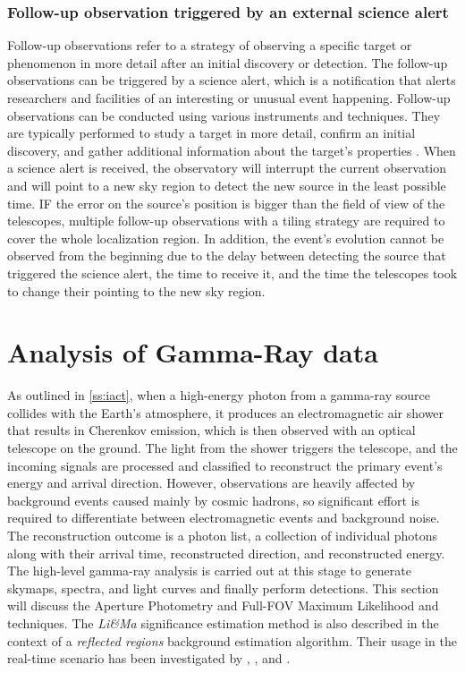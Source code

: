 \subsubsection{Follow-up observation triggered by an external science alert}
\label{s:follow-up-observation}
Follow-up observations refer to a strategy of observing a specific target or phenomenon in more detail after an initial discovery or detection. The follow-up observations can be triggered by a science alert, which is a notification that alerts researchers and facilities of an interesting or unusual event happening. Follow-up observations can be conducted using various instruments and techniques. They are typically performed to study a target in more detail, confirm an initial discovery, and gather additional information about the target's properties \cite{ScienceWithCherenkovTelescopeArray2018}. When a science alert is received, the observatory will interrupt the current observation and will point to a new sky region to detect the new source in the least possible time. IF the error on the source's position is bigger than the field of view of the telescopes,  multiple follow-up observations with a tiling strategy \cite{bulgarelli2015on} are required to cover the whole localization region. In addition, the event's evolution cannot be observed from the beginning due to the delay between detecting the source that triggered the science alert, the time to receive it, and the time the telescopes took to change their pointing to the new sky region. 



\section{Analysis of Gamma-Ray data}
\label{s:gamma-ray-data-analysis}
As outlined in \autoref{ss:iact}, when a high-energy photon from a gamma-ray source collides with the Earth's atmosphere, it produces an electromagnetic air shower that results in Cherenkov emission, which is then observed with an optical telescope on the ground. The light from the shower triggers the telescope, and the incoming signals are processed and classified to reconstruct the primary event's energy and arrival direction. However, observations are heavily affected by background events caused mainly by cosmic hadrons, so significant effort is required to differentiate between electromagnetic events and background noise. The reconstruction outcome is a photon list, a collection of individual photons along with their arrival time, reconstructed direction, and reconstructed energy. The high-level gamma-ray analysis is carried out at this stage to generate skymaps, spectra, and light curves and finally perform detections. This section will discuss the Aperture Photometry and Full-FOV Maximum Likelihood and  techniques. The \textit{Li\&Ma} significance estimation method is also described in the context of a \textit{reflected regions} background estimation algorithm. Their usage in the real-time scenario has been investigated by \cite{tampieri2020real}, \cite{di2020detection}, and \cite{di2021detection}. 

